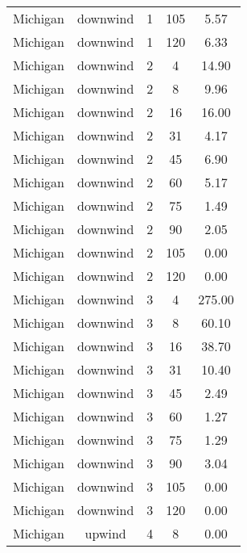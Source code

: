 \documentclass{article}
\begin{document}
\begin{longtable}[H]{ccccc}
Michigan  & downwind  & 1        & 105          & 5.57                    \\
Michigan  & downwind  & 1        & 120          & 6.33                    \\
Michigan  & downwind  & 2        & 4            & 14.90                   \\
Michigan  & downwind  & 2        & 8            & 9.96                    \\
Michigan  & downwind  & 2        & 16           & 16.00                   \\
Michigan  & downwind  & 2        & 31           & 4.17                    \\
Michigan  & downwind  & 2        & 45           & 6.90                    \\
Michigan  & downwind  & 2        & 60           & 5.17                    \\
Michigan  & downwind  & 2        & 75           & 1.49                    \\
Michigan  & downwind  & 2        & 90           & 2.05                    \\
Michigan  & downwind  & 2        & 105          & 0.00                    \\
Michigan  & downwind  & 2        & 120          & 0.00                    \\
Michigan  & downwind  & 3        & 4            & 275.00                  \\
Michigan  & downwind  & 3        & 8            & 60.10                   \\
Michigan  & downwind  & 3        & 16           & 38.70                   \\
Michigan  & downwind  & 3        & 31           & 10.40                   \\
Michigan  & downwind  & 3        & 45           & 2.49                    \\
Michigan  & downwind  & 3        & 60           & 1.27                    \\
Michigan  & downwind  & 3        & 75           & 1.29                    \\
Michigan  & downwind  & 3        & 90           & 3.04                    \\
Michigan  & downwind  & 3        & 105          & 0.00                    \\
Michigan  & downwind  & 3        & 120          & 0.00                    \\
Michigan  & upwind    & 4        & 8            & 0.00                    \\

\end{longtable}
\end{document}
